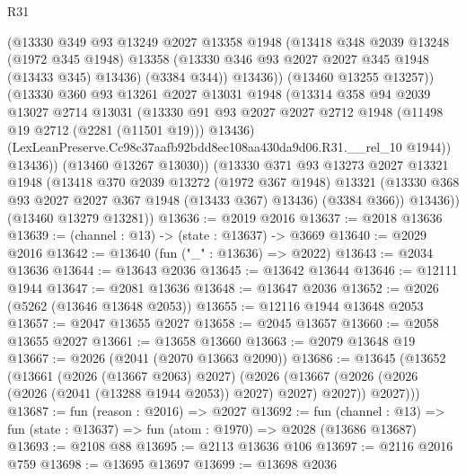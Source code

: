 \begin{lexlean}{R31}
\begin{coremodule}
                (@13330
                  @349
                  @93
                  @13249
                  @2027
                  @13358
                  @1948
                  (@13418
                    @348
                    @2039
                    @13248
                    (@1972 @345 @1948)
                    @13358
                    (@13330 @346 @93 @2027 @2027 @345 @1948 (@13433 @345) @13436)
                    (@3384 @344))
                  @13436))
              (@13460 @13255 @13257))
            (@13330
              @360
              @93
              @13261
              @2027
              @13031
              @1948
              (@13314
                @358
                @94
                @2039
                @13027
                @2714
                @13031
                (@13330
                  @91
                  @93
                  @2027
                  @2027
                  @2712
                  @1948
                  (@11498 @19 @2712 (@2281 (@11501 @19)))
                  @13436)
                (LexLeanPreserve.Cc98c37aafb92bdd8ec108aa430da9d06.R31.__rel_10 @1944))
              @13436))
          (@13460 @13267 @13030))
        (@13330
          @371
          @93
          @13273
          @2027
          @13321
          @1948
          (@13418
            @370
            @2039
            @13272
            (@1972 @367 @1948)
            @13321
            (@13330 @368 @93 @2027 @2027 @367 @1948 (@13433 @367) @13436)
            (@3384 @366))
          @13436))
      (@13460 @13279 @13281))
@13636 := @2019 @2016
@13637 := @2018 @13636
@13639 := (channel : @13) -> (state : @13637) -> @3669
@13640 := @2029 @2016
@13642 := @13640 (fun ("_" : @13636) => @2022)
@13643 := @2034 @13636
@13644 := @13643 @2036
@13645 := @13642 @13644
@13646 := @12111 @1944
@13647 := @2081 @13636
@13648 := @13647 @2036
@13652 := @2026 (@5262 (@13646 @13648 @2053))
@13655 := @12116 @1944 @13648 @2053
@13657 := @2047 @13655 @2027
@13658 := @2045 @13657
@13660 := @2058 @13655 @2027
@13661 := @13658 @13660
@13663 := @2079 @13648 @19
@13667 := @2026 (@2041 (@2070 @13663 @2090))
@13686 := @13645
    (@13652
      (@13661
        (@2026 (@13667 @2063) @2027)
        (@2026
          (@13667 (@2026 (@2026 (@2026 (@2041 (@13288 @1944 @2053)) @2027) @2027) @2027))
          @2027)))
@13687 := fun (reason : @2016) => @2027
@13692 := fun (channel : @13) => fun (state : @13637) => fun (atom : @1970) => @2028 (@13686 @13687)
@13693 := @2108 @88
@13695 := @2113 @13636 @106
@13697 := @2116 @2016 @759
@13698 := @13695 @13697
@13699 := @13698 @2036

\end{coremodule}
\end{lexlean}
